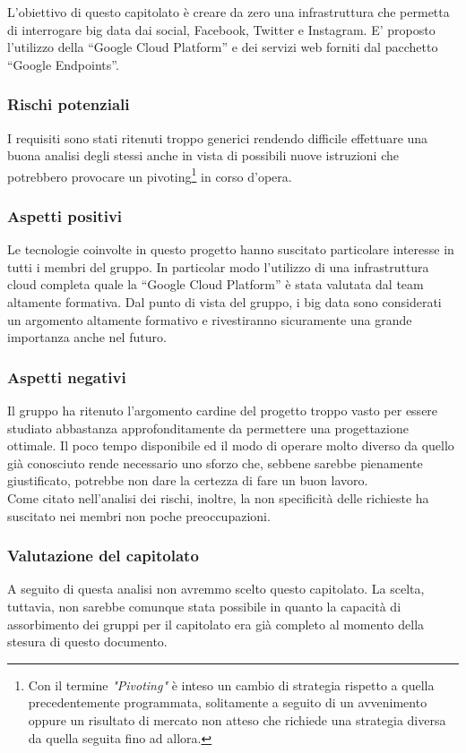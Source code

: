 L'obiettivo di questo capitolato è creare da zero una infrastruttura che permetta di interrogare big data dai social, \gls{Facebook}, Twitter e Instagram.
E’ proposto l'utilizzo della “Google Cloud Platform” e dei servizi web forniti dal pacchetto “Google Endpoints”. 

\subsubsection{Rischi potenziali}
I requisiti sono stati ritenuti troppo generici  rendendo difficile effettuare una buona analisi degli stessi anche in vista di possibili nuove istruzioni che potrebbero provocare un pivoting\footnote{Con il termine \textit{"Pivoting"} è inteso un cambio di strategia rispetto a quella precedentemente programmata, solitamente a seguito di un avvenimento oppure un risultato di mercato non atteso che richiede una strategia diversa da quella seguita fino ad allora.} in corso d'opera.

\subsubsection{Aspetti positivi}
Le tecnologie coinvolte in questo progetto hanno suscitato particolare interesse in tutti i membri del gruppo. In particolar modo l'utilizzo di una infrastruttura cloud completa quale la “Google Cloud Platform” è stata valutata dal team altamente formativa. Dal punto di vista del gruppo, i big data sono considerati un argomento altamente formativo e rivestiranno sicuramente una grande importanza anche nel futuro.

\subsubsection{Aspetti negativi}
Il gruppo ha ritenuto l'argomento cardine del progetto troppo vasto per essere studiato abbastanza approfonditamente da permettere una progettazione ottimale. Il poco tempo disponibile ed il modo di operare molto diverso da quello già conosciuto rende necessario uno sforzo che, sebbene
sarebbe pienamente giustificato, potrebbe non dare la certezza di fare un buon lavoro.\\
Come citato nell'analisi dei rischi, inoltre, la non specificità delle richieste  ha suscitato nei membri non poche preoccupazioni.


\subsubsection{Valutazione del capitolato} 

A seguito di questa analisi non avremmo scelto questo capitolato. La scelta, tuttavia, non sarebbe comunque stata possibile in quanto la capacità di assorbimento dei gruppi per il capitolato era già completo al momento della stesura di questo documento.

